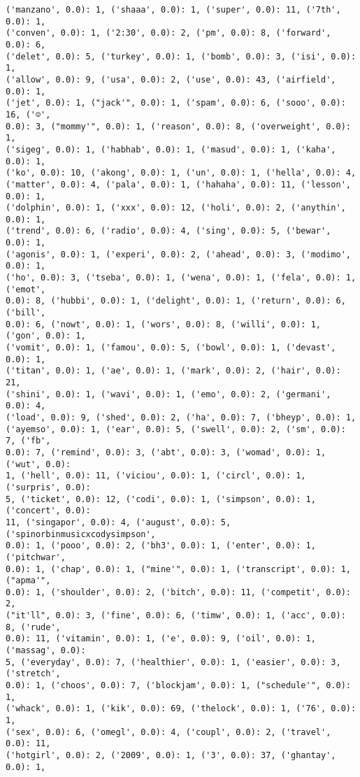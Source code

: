 \documentclass[11pt]{article}
\begin{document}
\begin{Verbatim}[commandchars=\\\{\}]
('manzano', 0.0): 1, ('shaaa', 0.0): 1, ('super', 0.0): 11, ('7th', 0.0): 1,
('conven', 0.0): 1, ('2:30', 0.0): 2, ('pm', 0.0): 8, ('forward', 0.0): 6,
('delet', 0.0): 5, ('turkey', 0.0): 1, ('bomb', 0.0): 3, ('isi', 0.0): 1,
('allow', 0.0): 9, ('usa', 0.0): 2, ('use', 0.0): 43, ('airfield', 0.0): 1,
('jet', 0.0): 1, ("jack'", 0.0): 1, ('spam', 0.0): 6, ('sooo', 0.0): 16, ('☺',
0.0): 3, ("mommy'", 0.0): 1, ('reason', 0.0): 8, ('overweight', 0.0): 1,
('sigeg', 0.0): 1, ('habhab', 0.0): 1, ('masud', 0.0): 1, ('kaha', 0.0): 1,
('ko', 0.0): 10, ('akong', 0.0): 1, ('un', 0.0): 1, ('hella', 0.0): 4,
('matter', 0.0): 4, ('pala', 0.0): 1, ('hahaha', 0.0): 11, ('lesson', 0.0): 1,
('dolphin', 0.0): 1, ('xxx', 0.0): 12, ('holi', 0.0): 2, ('anythin', 0.0): 1,
('trend', 0.0): 6, ('radio', 0.0): 4, ('sing', 0.0): 5, ('bewar', 0.0): 1,
('agonis', 0.0): 1, ('experi', 0.0): 2, ('ahead', 0.0): 3, ('modimo', 0.0): 1,
('ho', 0.0): 3, ('tseba', 0.0): 1, ('wena', 0.0): 1, ('fela', 0.0): 1, ('emot',
0.0): 8, ('hubbi', 0.0): 1, ('delight', 0.0): 1, ('return', 0.0): 6, ('bill',
0.0): 6, ('nowt', 0.0): 1, ('wors', 0.0): 8, ('willi', 0.0): 1, ('gon', 0.0): 1,
('vomit', 0.0): 1, ('famou', 0.0): 5, ('bowl', 0.0): 1, ('devast', 0.0): 1,
('titan', 0.0): 1, ('ae', 0.0): 1, ('mark', 0.0): 2, ('hair', 0.0): 21,
('shini', 0.0): 1, ('wavi', 0.0): 1, ('emo', 0.0): 2, ('germani', 0.0): 4,
('load', 0.0): 9, ('shed', 0.0): 2, ('ha', 0.0): 7, ('bheyp', 0.0): 1,
('ayemso', 0.0): 1, ('ear', 0.0): 5, ('swell', 0.0): 2, ('sm', 0.0): 7, ('fb',
0.0): 7, ('remind', 0.0): 3, ('abt', 0.0): 3, ('womad', 0.0): 1, ('wut', 0.0):
1, ('hell', 0.0): 11, ('viciou', 0.0): 1, ('circl', 0.0): 1, ('surpris', 0.0):
5, ('ticket', 0.0): 12, ('codi', 0.0): 1, ('simpson', 0.0): 1, ('concert', 0.0):
11, ('singapor', 0.0): 4, ('august', 0.0): 5, ('spinorbinmusicxcodysimpson',
0.0): 1, ('pooo', 0.0): 2, ('bh3', 0.0): 1, ('enter', 0.0): 1, ('pitchwar',
0.0): 1, ('chap', 0.0): 1, ("mine'", 0.0): 1, ('transcript', 0.0): 1, ("apma'",
0.0): 1, ('shoulder', 0.0): 2, ('bitch', 0.0): 11, ('competit', 0.0): 2,
("it'll", 0.0): 3, ('fine', 0.0): 6, ('timw', 0.0): 1, ('acc', 0.0): 8, ('rude',
0.0): 11, ('vitamin', 0.0): 1, ('e', 0.0): 9, ('oil', 0.0): 1, ('massag', 0.0):
5, ('everyday', 0.0): 7, ('healthier', 0.0): 1, ('easier', 0.0): 3, ('stretch',
0.0): 1, ('choos', 0.0): 7, ('blockjam', 0.0): 1, ("schedule'", 0.0): 1,
('whack', 0.0): 1, ('kik', 0.0): 69, ('thelock', 0.0): 1, ('76', 0.0): 1,
('sex', 0.0): 6, ('omegl', 0.0): 4, ('coupl', 0.0): 2, ('travel', 0.0): 11,
('hotgirl', 0.0): 2, ('2009', 0.0): 1, ('3', 0.0): 37, ('ghantay', 0.0): 1,

\end{Verbatim}
\end{document}
